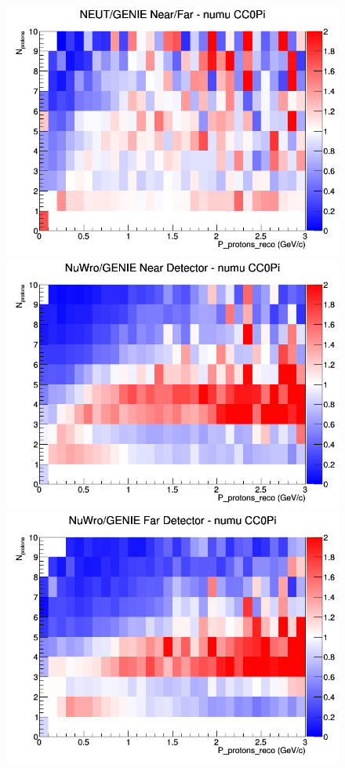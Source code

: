 \documentclass[12pt]{article}
\begin{document}
\begin{figure}[h]
\endminipage
{}
\includegraphics[width=\linewidth]{eff_N_P/GAr/protons/ratios/CC0Pi_NEUT_GENIE_numu_NF_N_P.png}
\endminipage
\newline
{}
\includegraphics[width=\linewidth]{eff_N_P/GAr/protons/ratios/CC0Pi_NuWro_GENIE_numu_near_N_P.png}
\endminipage
{}
\includegraphics[width=\linewidth]{eff_N_P/GAr/protons/ratios/CC0Pi_NuWro_GENIE_numu_far_N_P.png}

\end{figure}
\end{document}
